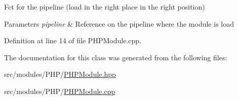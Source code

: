 Fct for the pipeline (load in the right place in the right position) 


\begin{DoxyParams}{Parameters}
{\em pipeline} & Reference on the pipeline where the module is load \\
\hline
\end{DoxyParams}


Definition at line 14 of file P\+H\+P\+Module.\+cpp.



The documentation for this class was generated from the following files\+:\begin{DoxyCompactItemize}
\item 
src/modules/\+P\+H\+P/\hyperlink{_p_h_p_module_8hpp}{P\+H\+P\+Module.\+hpp}\item 
src/modules/\+P\+H\+P/\hyperlink{_p_h_p_module_8cpp}{P\+H\+P\+Module.\+cpp}\end{DoxyCompactItemize}
